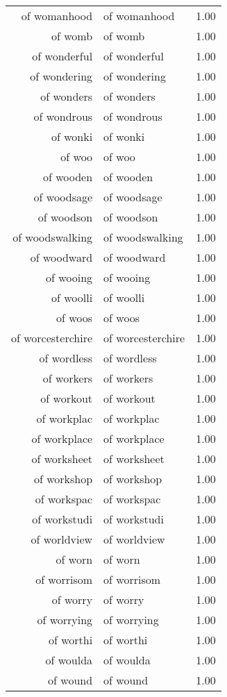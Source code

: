 \begin{table}[ht]
\begin{tabular}{rlr}
  of womanhood & of womanhood & 1.00 \\ 
  of womb & of womb & 1.00 \\ 
  of wonderful & of wonderful & 1.00 \\ 
  of wondering & of wondering & 1.00 \\ 
  of wonders & of wonders & 1.00 \\ 
  of wondrous & of wondrous & 1.00 \\ 
  of wonki & of wonki & 1.00 \\ 
  of woo & of woo & 1.00 \\ 
  of wooden & of wooden & 1.00 \\ 
  of woodsage & of woodsage & 1.00 \\ 
  of woodson & of woodson & 1.00 \\ 
  of woodswalking & of woodswalking & 1.00 \\ 
  of woodward & of woodward & 1.00 \\ 
  of wooing & of wooing & 1.00 \\ 
  of woolli & of woolli & 1.00 \\ 
  of woos & of woos & 1.00 \\ 
  of worcesterchire & of worcesterchire & 1.00 \\ 
  of wordless & of wordless & 1.00 \\ 
  of workers & of workers & 1.00 \\ 
  of workout & of workout & 1.00 \\ 
  of workplac & of workplac & 1.00 \\ 
  of workplace & of workplace & 1.00 \\ 
  of worksheet & of worksheet & 1.00 \\ 
  of workshop & of workshop & 1.00 \\ 
  of workspac & of workspac & 1.00 \\ 
  of workstudi & of workstudi & 1.00 \\ 
  of worldview & of worldview & 1.00 \\ 
  of worn & of worn & 1.00 \\ 
  of worrisom & of worrisom & 1.00 \\ 
  of worry & of worry & 1.00 \\ 
  of worrying & of worrying & 1.00 \\ 
  of worthi & of worthi & 1.00 \\ 
  of woulda & of woulda & 1.00 \\ 
  of wound & of wound & 1.00 \\ 

\end{tabular}
\end{table}
